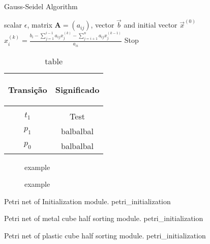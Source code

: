 \begin{algorithm2e}
\caption{Gauss-Seidel Algorithm}\label{alg:gauss-seidel}
\KwIn
{%
scalar $\epsilon$,
matrix $\mathbf{A} = (a_{ij})$,
vector $\vec{b}$
and initial vector $\vec{x}^{(0)}$
}
{
{
$
x_i^{(k)} =
\frac
{
b_i-\sum_{j=1}^{i-1}a_{ij}x_j^{(k)}
-\sum_{j=i+1}^{n}a_{ij}x_j^{(k-1)}
}%
{a_{ii}}
$\;
}
{Stop}
}
\end{algorithm2e}

\begin{table}[H]
  \centering
  \caption{table}
  \begin{tabular}{cc}
    \label{tab:tab1}
    \hypertarget{tab:1}{}
    Transição&Significado\\
    \hline \\
    \hyperlink{partialNet:t1}{\hypertarget{partialTable:t1}{$t_{1}$}}&Test\\
    \hyperlink{partialNet:p1}{\hypertarget{partialTable:p1}{$p_{1}$}}&balbalbal\\
    \hyperlink{partialNet:p0m2}{\hypertarget{partialTable:p0m2}{$p_{0}$}}&balbalbal
  \end{tabular}
\end{table}

\newpage
\begin{figure}[h]
  \centering
  
  \caption{example }
  \label{fig:example}
\end{figure}

\newpage
\begin{figure}[h]
  \centering
  
  \caption{example }
  \label{fig:example}
\end{figure}

\OmegaSet

\clearpage

{Petri net of Initialization module.}
{petri_initialization}



{Petri net of metal cube half sorting module.}
{petri_initialization}



{Petri net of plastic cube half sorting module.}
{petri_initialization}

